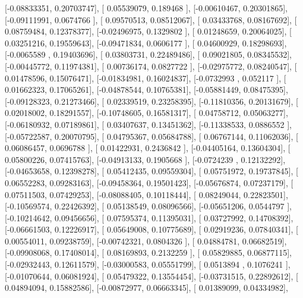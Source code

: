 \documentclass{article}
\begin{document}
       [-0.08833351,  0.20703747],
       [ 0.05539079,  0.189468  ],
       [-0.00610467,  0.20301865],
       [-0.09111991,  0.0674766 ],
       [ 0.09570513,  0.08512067],
       [ 0.03433768,  0.08167692],
       [ 0.08759484,  0.12378377],
       [-0.02496975,  0.1329802 ],
       [ 0.01248659,  0.20064025],
       [ 0.03251216,  0.19559643],
       [-0.09471834,  0.0606177 ],
       [ 0.04600929,  0.18298693],
       [-0.0065589 ,  0.19403696],
       [ 0.03803731,  0.22489486],
       [ 0.09021805,  0.08345532],
       [-0.00445772,  0.11974381],
       [ 0.00736174,  0.0827722 ],
       [-0.02975772,  0.08240547],
       [ 0.01478596,  0.15076471],
       [-0.01834981,  0.16024837],
       [-0.0732993 ,  0.052117  ],
       [ 0.01662323,  0.17065261],
       [-0.04878544,  0.10765381],
       [-0.05881449,  0.08475395],
       [-0.09128323,  0.21273466],
       [ 0.02339519,  0.23258395],
       [-0.11810356,  0.20131679],
       [ 0.02018002,  0.18291557],
       [-0.10748605,  0.16581317],
       [ 0.04758712,  0.05063277],
       [-0.06180932,  0.07189861],
       [ 0.03407637,  0.13451362],
       [-0.11338533,  0.0886552 ],
       [-0.05722587,  0.20070795],
       [ 0.04795367,  0.05684788],
       [ 0.06767144,  0.11062036],
       [ 0.06086457,  0.0696788 ],
       [ 0.01422931,  0.2436842 ],
       [-0.04405164,  0.13604304],
       [ 0.05800226,  0.07415763],
       [-0.04913133,  0.1905668 ],
       [-0.0724239 ,  0.12132292],
       [-0.04653658,  0.12398278],
       [ 0.05412435,  0.09559304],
       [ 0.05751972,  0.19737845],
       [ 0.06552283,  0.09283163],
       [-0.09458364,  0.19501423],
       [-0.05676874,  0.07237179],
       [ 0.07511503,  0.07429253],
       [-0.08088405,  0.10118444],
       [ 0.08249044,  0.22823501],
       [-0.10569574,  0.22426392],
       [ 0.05138549,  0.08096566],
       [-0.05651206,  0.0544797 ],
       [-0.10214642,  0.09456656],
       [ 0.07595374,  0.11395031],
       [ 0.03727992,  0.14708392],
       [-0.06661503,  0.12226917],
       [ 0.05649008,  0.10775689],
       [ 0.02919236,  0.07840341],
       [ 0.00554011,  0.09238759],
       [-0.00742321,  0.0804326 ],
       [ 0.04884781,  0.06682519],
       [-0.09908068,  0.17408014],
       [ 0.08169893,  0.2132259 ],
       [ 0.05829885,  0.06877115],
       [-0.02932443,  0.12611579],
       [-0.03000583,  0.05551799],
       [ 0.0513894 ,  0.1076241 ],
       [-0.01070644,  0.06081924],
       [ 0.05479322,  0.13554454],
       [-0.03731515,  0.22892612],
       [ 0.04894094,  0.15882586],
       [-0.00872977,  0.06663345],
       [ 0.01389099,  0.04334982],
\end{document}
